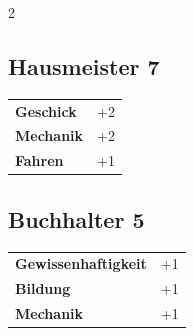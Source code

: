 \begin{multicols}{2}
\begin{tcolorbox}

\end{tcolorbox}

\begin{tcolorbox}
    \subsection*{Hausmeister \hfill \small{7 }}
    \tcblower




\begin{tabular}{@{}ll@{}}
    \textbf{Geschick} & +2\\
    \textbf{Mechanik} & +2\\
    \textbf{Fahren} & +1\\
\end{tabular}


\end{tcolorbox}

\begin{tcolorbox}
    \subsection*{Buchhalter \hfill \small{5 }}
    \tcblower




\begin{tabular}{@{}ll@{}}
    \textbf{Gewissenhaftigkeit} & +1\\
    \textbf{Bildung} & +1\\
    \textbf{Mechanik} & +1\\
\end{tabular}



\end{tcolorbox}
\end{multicols}
